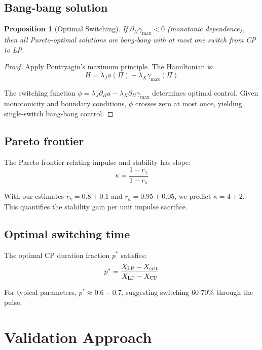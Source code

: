 \documentclass[aps,pre,twocolumn,showpacs,superscriptaddress]{revtex4-2}
\newtheorem{proposition}[theorem]{Proposition}
\theoremstyle{definition}
\begin{document}
\subsection{Bang-bang solution}

\begin{proposition}[Optimal Switching]
\label{prop:bangbang}
If $\partial_\Pi\gamma_{\max} < 0$ (monotonic dependence), then all Pareto-optimal solutions are bang-bang with at most one switch from CP to LP.
\end{proposition}

\begin{proof}
Apply Pontryagin's maximum principle. The Hamiltonian is:
\begin{equation}
H = \lambda_J a(\Pi) - \lambda_X \gamma_{\max}(\Pi)
\end{equation}

The switching function $\phi = \lambda_J \partial_\Pi a - \lambda_X \partial_\Pi\gamma_{\max}$ determines optimal control. Given monotonicity and boundary conditions, $\phi$ crosses zero at most once, yielding single-switch bang-bang control.
\end{proof}

\subsection{Pareto frontier}

The Pareto frontier relating impulse and stability has slope:
\begin{equation}
\kappa = \frac{1-r_\gamma}{1-r_a}
\label{eq:pareto_slope}
\end{equation}

With our estimates $r_\gamma = 0.8 \pm 0.1$ and $r_a = 0.95 \pm 0.05$, we predict $\kappa = 4 \pm 2$. This quantifies the stability gain per unit impulse sacrifice.

\subsection{Optimal switching time}

The optimal CP duration fraction $p^*$ satisfies:
\begin{equation}
p^* = \frac{X_{\rm LP} - X_{\rm crit}}{X_{\rm LP} - X_{\rm CP}}
\end{equation}

For typical parameters, $p^* \approx 0.6-0.7$, suggesting switching 60-70\% through the pulse.

\section{Validation Approach}\label{sec:validation}
\end{document}
